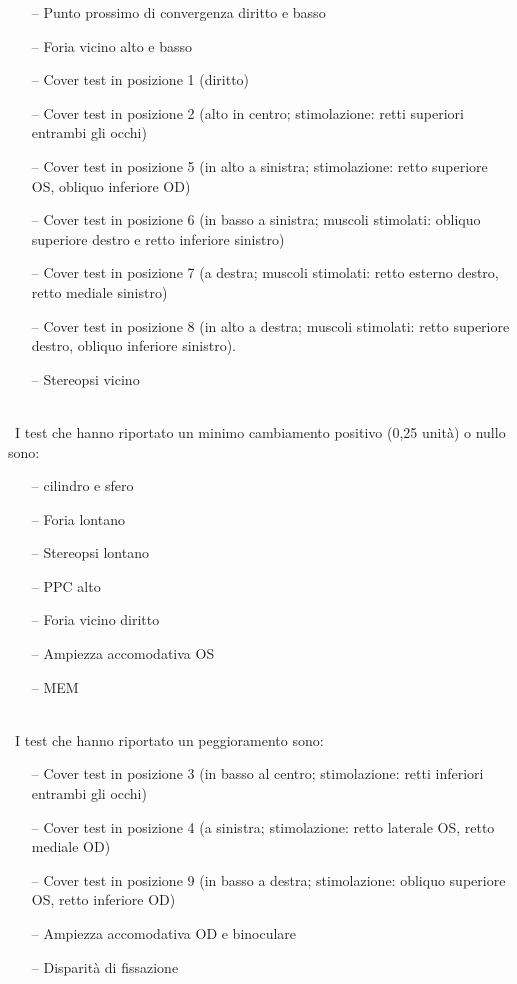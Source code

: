 \begin{itemize}
 \itemsep-0.5em
 \item[--]Punto prossimo di convergenza diritto e basso
 \item[--]Foria vicino alto e basso
 \item[--]Cover test in posizione 1 (diritto)
 \item[--]Cover test in posizione  2 (alto in centro; stimolazione: retti superiori entrambi gli occhi)
 \item[--]Cover test in posizione 5 (in alto a sinistra; stimolazione: retto superiore OS, obliquo inferiore OD)
 \item[--]Cover test in posizione  6 (in basso a sinistra; muscoli stimolati: obliquo superiore destro e retto inferiore sinistro)
 \item[--]Cover test in posizione 7 (a destra; muscoli stimolati: retto esterno destro, retto mediale sinistro)
 \item[--]Cover test in posizione 8 (in alto a destra; muscoli stimolati: retto superiore destro, obliquo inferiore sinistro).
 \item[--]Stereopsi vicino
\end{itemize}
\\\
I test che hanno riportato un minimo cambiamento positivo (0,25 unità) o nullo sono:
\begin{itemize}
 \itemsep-0.5em
 \item[--]cilindro e sfero
 \item[--]Foria lontano
 \item[--]Stereopsi lontano
 \item[--]PPC alto
 \item[--]Foria vicino diritto
 \item[--]Ampiezza accomodativa OS
 \item[--]MEM
 \end{itemize}
\\\
I test che hanno riportato un peggioramento sono:
\begin{itemize}
 \itemsep-0.5em
 \item[--]Cover test in posizione 3 (in basso al centro; stimolazione: retti inferiori entrambi gli occhi)
 \item[--]Cover test in posizione 4 (a sinistra; stimolazione: retto laterale OS, retto mediale OD)
 \item[--]Cover test in posizione 9 (in basso a destra; stimolazione: obliquo superiore OS, retto inferiore OD)
 \item[--]Ampiezza accomodativa OD e binoculare
 \item[--]Disparità di fissazione
 \end{itemize}
 
